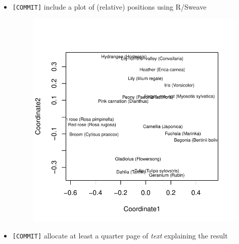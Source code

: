 \documentclass[12pt]{article}
\begin{document}
\begin{itemize}
    \item \verb+[COMMIT]+ include a plot of (relative) positions using R/Sweave
    \begin{figure}[h]
      \centering
\includegraphics{ywu67HW3-013}
    \end{figure}
\pagebreak
    \item \verb+[COMMIT]+ allocate at least a quarter page of \emph{text} explaining the result
\end{itemize}


\nocite{*}

\end{document}
